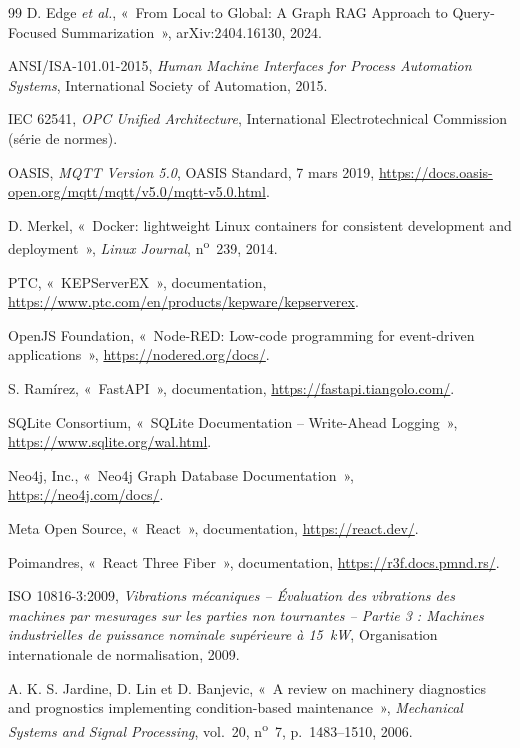 \begin{thebibliography}{99}
 D. Edge \textit{et al.}, «~From Local to Global: A Graph RAG Approach to Query-Focused Summarization~», arXiv:2404.16130, 2024.

 ANSI/ISA-101.01-2015, \textit{Human Machine Interfaces for Process Automation Systems}, International Society of Automation, 2015.

 IEC 62541, \textit{OPC Unified Architecture}, International Electrotechnical Commission (série de normes).

 OASIS, \textit{MQTT Version 5.0}, OASIS Standard, 7 mars 2019, \url{https://docs.oasis-open.org/mqtt/mqtt/v5.0/mqtt-v5.0.html}.

 D. Merkel, «~Docker: lightweight Linux containers for consistent development and deployment~», \textit{Linux Journal}, n\textsuperscript{o}~239, 2014.

 PTC, «~KEPServerEX~», documentation, \url{https://www.ptc.com/en/products/kepware/kepserverex}.

 OpenJS Foundation, «~Node-RED: Low-code programming for event-driven applications~», \url{https://nodered.org/docs/}.


 S. Ramírez, «~FastAPI~», documentation, \url{https://fastapi.tiangolo.com/}.


 SQLite Consortium, «~SQLite Documentation -- Write-Ahead Logging~», \url{https://www.sqlite.org/wal.html}.

 Neo4j, Inc., «~Neo4j Graph Database Documentation~», \url{https://neo4j.com/docs/}.


 Meta Open Source, «~React~», documentation, \url{https://react.dev/}.

 Poimandres, «~React Three Fiber~», documentation, \url{https://r3f.docs.pmnd.rs/}.

 ISO 10816-3:2009, \textit{Vibrations mécaniques -- Évaluation des vibrations des machines par mesurages sur les parties non tournantes -- Partie 3 : Machines industrielles de puissance nominale supérieure à 15~kW}, Organisation internationale de normalisation, 2009.

 A. K. S. Jardine, D. Lin et D. Banjevic, «~A review on machinery diagnostics and prognostics implementing condition-based maintenance~», \textit{Mechanical Systems and Signal Processing}, vol.~20, n\textsuperscript{o}~7, p.~1483--1510, 2006.



\end{thebibliography}

